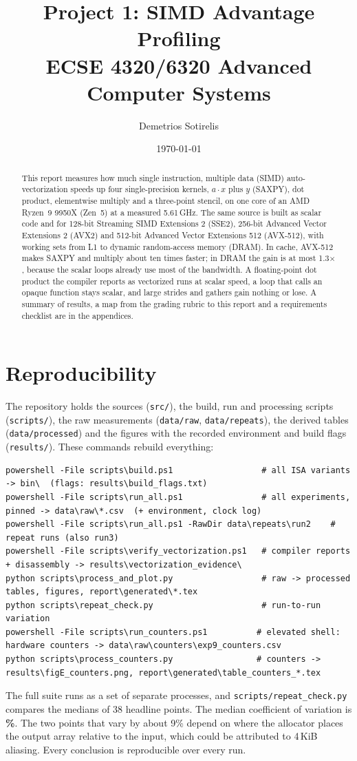 \documentclass{article}
\title{Project 1: SIMD Advantage Profiling\\[3pt]\large ECSE 4320/6320 Advanced Computer Systems}
\author{Demetrios Sotirelis}
\date{\today}
\begin{document}
\maketitle

\begin{abstract}
  This report measures how much single instruction, multiple data (SIMD) auto-vectorization speeds up four single-precision kernels, $a\cdot x$ plus $y$ (SAXPY), dot product, elementwise multiply and a three-point stencil, on one core of an AMD Ryzen~9 9950X (Zen~5) at a measured 5.61\,GHz. The same source is built as scalar code and for 128-bit Streaming SIMD Extensions 2 (SSE2), 256-bit Advanced Vector Extensions 2 (AVX2) and 512-bit Advanced Vector Extensions 512 (AVX-512), with working sets from L1 to dynamic random-access memory (DRAM). In cache, AVX-512 makes SAXPY and multiply about ten times faster; in DRAM the gain is at most 1.3$\times$, because the scalar loops already use most of the bandwidth. A floating-point dot product the compiler reports as vectorized runs at scalar speed, a loop that calls an opaque function stays scalar, and large strides and gathers gain nothing or lose. A summary of results, a map from the grading rubric to this report and a requirements checklist are in the appendices.
\end{abstract}

\section{Reproducibility}\label{sec:repro}
The repository holds the sources (\texttt{src/}), the build, run and processing scripts (\texttt{scripts/}), the raw measurements (\texttt{data/raw}, \texttt{data/repeats}), the derived tables (\texttt{data/processed}) and the figures with the recorded environment and build flags (\texttt{results/}). These commands rebuild everything:
\begin{lstlisting}
powershell -File scripts\build.ps1                  # all ISA variants -> bin\  (flags: results\build_flags.txt)
powershell -File scripts\run_all.ps1                # all experiments, pinned -> data\raw\*.csv  (+ environment, clock log)
powershell -File scripts\run_all.ps1 -RawDir data\repeats\run2    # repeat runs (also run3)
powershell -File scripts\verify_vectorization.ps1   # compiler reports + disassembly -> results\vectorization_evidence\
python scripts\process_and_plot.py                  # raw -> processed tables, figures, report\generated\*.tex
python scripts\repeat_check.py                      # run-to-run variation
powershell -File scripts\run_counters.ps1          # elevated shell: hardware counters -> data\raw\counters\exp9_counters.csv
python scripts\process_counters.py                 # counters -> results\figE_counters.png, report\generated\table_counters_*.tex
\end{lstlisting}
The full suite runs as a set of separate processes, and \nolinkurl{scripts/repeat_check.py} compares the medians of 38 headline points. The median coefficient of variation is \textbf{\runcvmedian\%}. The two points that vary by about 9\% depend on where the allocator places the output array relative to the input, which could be attributed to 4\,KiB aliasing. Every conclusion is reproducible over every run.
\end{document}

